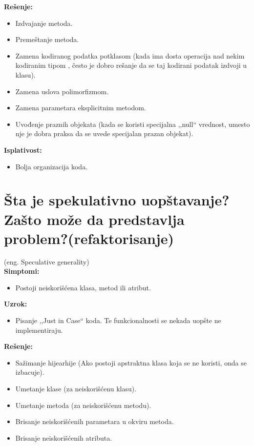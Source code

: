 \documentclass[a4paper]{article}
\begin{document}
  \noindent \textbf{Rešenje:} 
  \begin{itemize}
    \item Izdvajanje metoda.
    \item Premeštanje metoda.
    \item Zamena kodiranog podatka potklasom (kada ima dosta operacija nad nekim kodiranim tipom
          , često je dobro rešanje da se taj kodirani podatak izdvoji u klasu).
    \item Zamena uslova polimorfizmom.
    \item Zamena parametara eksplicitnim metodom.
    \item Uvođenje praznih objekata (kada se koristi specijalna ,,null`` vrednost, umesto
          nje je dobra praksa da se uvede specijalan prazan objekat).
  \end{itemize}

  \noindent \textbf{Isplativost:} 
  \begin{itemize}
    \item Bolja organizacija koda.
  \end{itemize}

\section{Šta je spekulativno uopštavanje? Zašto može da predstavlja
        problem?(refaktorisanje)}
  (eng. Speculative generality)\\
  \textbf{Simptomi:}
  \begin{itemize}
    \item Postoji neiskorišćena klasa, metod ili atribut.
  \end{itemize}

  \noindent \textbf{Uzrok:} 
  \begin{itemize}
    \item Pisanje ,,Just in Case`` koda. Te funkcionalnosti se nekada uopšte ne implementiraju.
  \end{itemize}

  \noindent \textbf{Rešenje:} 
  \begin{itemize}
    \item Sažimanje hijearhije (Ako postoji apstraktna klasa koja se ne koristi, onda se izbacuje).
    \item Umetanje klase (za neiskorišćenu klasu).
    \item Umetanje metoda (za neiskorišćenu metodu).
    \item Brisanje neiskorišćenih parametara u okviru metoda.
    \item Brisanje neiskorišćenih atributa.
  \end{itemize}
\end{document}
